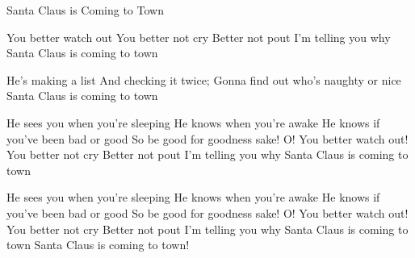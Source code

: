 \begin{sang}{Santa Claus is Coming to Town}{}
\begin{vers}
You better watch out
You better not cry
Better not pout
I'm telling you why
Santa Claus is coming to town
\end{vers}
\begin{vers}
He's making a list
And checking it twice;
Gonna find out who's naughty or nice
Santa Claus is coming to town
\end{vers}
\begin{vers}
He sees you when you're sleeping
He knows when you're awake
He knows if you've been bad or good
So be good for goodness sake!
O! You better watch out!
You better not cry
Better not pout
I'm telling you why
Santa Claus is coming to town
\end{vers}
\begin{vers}
He sees you when you're sleeping
He knows when you're awake
He knows if you've been bad or good
So be good for goodness sake!
O! You better watch out!
You better not cry
Better not pout
I'm telling you why
Santa Claus is coming to town
Santa Claus is coming to town!
\end{vers}
\vbox{}\vfill
\vbox{}\vfill
\vbox{}\vfill
\vbox{}\vfill
\vbox{}\vfill
\vbox{}\vfill
\vbox{}\vfill
\vbox{}\vfill
\vbox{}\vfill
\laps
\end{sang}
